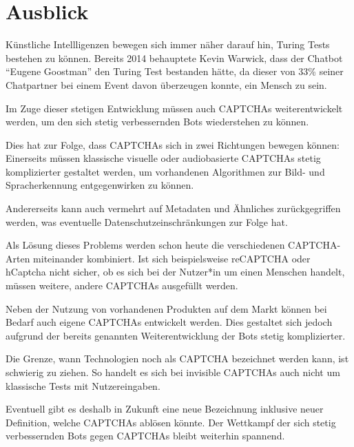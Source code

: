 \chapter{Ausblick}

Künstliche Intellligenzen bewegen sich immer näher darauf hin, Turing Tests bestehen zu können.
Bereits 2014 behauptete Kevin Warwick, dass der Chatbot ``Eugene Goostman'' den Turing Test bestanden hätte,
da dieser von 33\% seiner Chatpartner bei einem Event davon überzeugen konnte, ein Mensch zu sein. \cite{eugene}

Im Zuge dieser stetigen Entwicklung müssen auch CAPTCHAs weiterentwickelt werden,
um den sich stetig verbessernden Bots wiederstehen zu können. 

Dies hat zur Folge, dass CAPTCHAs sich in zwei Richtungen bewegen können:
Einerseits müssen klassische visuelle oder audiobasierte CAPTCHAs stetig komplizierter gestaltet werden,
um vorhandenen Algorithmen zur Bild- und Spracherkennung entgegenwirken zu können.

Andererseits kann auch vermehrt auf Metadaten und Ähnliches zurückgegriffen werden, was eventuelle Datenschutzeinschränkungen zur Folge hat.

Als Lösung dieses Problems werden schon heute die verschiedenen CAPTCHA-Arten miteinander kombiniert.
Ist sich beispielsweise reCAPTCHA oder hCaptcha nicht sicher, ob es sich bei der Nutzer*in um einen Menschen handelt,
müssen weitere, andere CAPTCHAs ausgefüllt werden.

Neben der Nutzung von vorhandenen Produkten auf dem Markt können bei Bedarf auch eigene CAPTCHAs entwickelt werden.
Dies gestaltet sich jedoch aufgrund der bereits genannten Weiterentwicklung der Bots stetig komplizierter.

Die Grenze, wann Technologien noch als CAPTCHA bezeichnet werden kann, ist schwierig zu ziehen.
So handelt es sich bei invisible CAPTCHAs auch nicht um klassische Tests mit Nutzereingaben.

Eventuell gibt es deshalb in Zukunft eine neue Bezeichnung inklusive neuer Definition, welche CAPTCHAs ablösen könnte.
Der Wettkampf der sich stetig verbessernden Bots gegen CAPTCHAs bleibt weiterhin spannend.